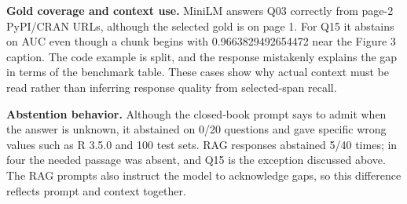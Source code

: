 \textbf{Gold coverage and context use.} MiniLM answers Q03 correctly from page-2 PyPI/CRAN URLs, although the selected gold is on page 1. For Q15 it abstains on AUC even though a chunk begins with 0.9663829492654472 near the Figure 3 caption. The code example is split, and the response mistakenly explains the gap in terms of the benchmark table. These cases show why actual context must be read rather than inferring response quality from selected-span recall.

\textbf{Abstention behavior.} Although the closed-book prompt says to admit when the answer is unknown, it abstained on 0/20 questions and gave specific wrong values such as R 3.5.0 and 100 test sets. RAG responses abstained 5/40 times; in four the needed passage was absent, and Q15 is the exception discussed above. The RAG prompts also instruct the model to acknowledge gaps, so this difference reflects prompt and context together.
